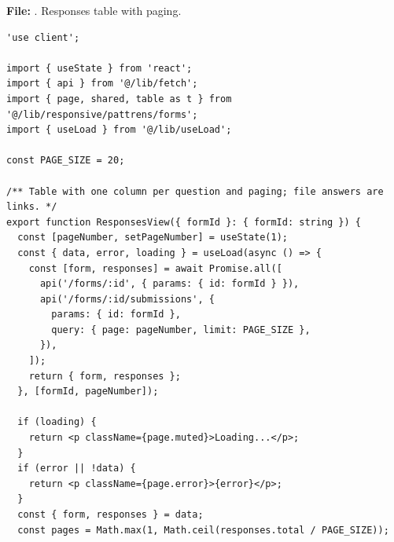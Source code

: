 \documentclass[11pt,a4paper]{article}
\begin{document}
\textbf{File:} . Responses table with paging.\par
\begin{lstlisting}
'use client';

import { useState } from 'react';
import { api } from '@/lib/fetch';
import { page, shared, table as t } from '@/lib/responsive/pattrens/forms';
import { useLoad } from '@/lib/useLoad';

const PAGE_SIZE = 20;

/** Table with one column per question and paging; file answers are links. */
export function ResponsesView({ formId }: { formId: string }) {
  const [pageNumber, setPageNumber] = useState(1);
  const { data, error, loading } = useLoad(async () => {
    const [form, responses] = await Promise.all([
      api('/forms/:id', { params: { id: formId } }),
      api('/forms/:id/submissions', {
        params: { id: formId },
        query: { page: pageNumber, limit: PAGE_SIZE },
      }),
    ]);
    return { form, responses };
  }, [formId, pageNumber]);

  if (loading) {
    return <p className={page.muted}>Loading...</p>;
  }
  if (error || !data) {
    return <p className={page.error}>{error}</p>;
  }
  const { form, responses } = data;
  const pages = Math.max(1, Math.ceil(responses.total / PAGE_SIZE));


\end{lstlisting}
\end{document}
